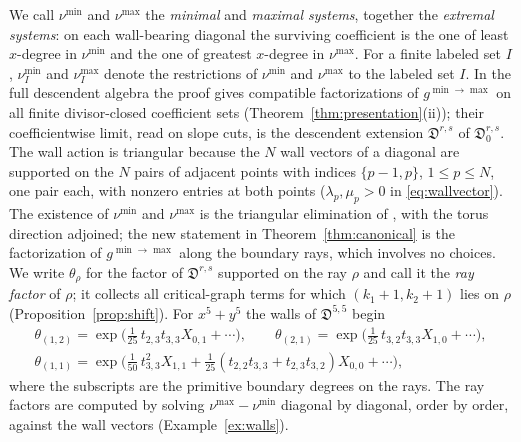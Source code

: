 \documentclass[11pt]{amsart}
\theoremstyle{definition}
\theoremstyle{remark}
\newcommand{\Dscr}{\mathfrak{D}}
\begin{document}
We call $\nu^{\min}$ and $\nu^{\max}$ the \emph{minimal} and \emph{maximal
systems}, together the \emph{extremal systems}: on each wall-bearing diagonal
the surviving coefficient is the one of least $x$-degree in $\nu^{\min}$ and
the one of greatest $x$-degree in $\nu^{\max}$.  For a finite labeled set $I$,
$\nu^{\min}_I$ and $\nu^{\max}_I$ denote the restrictions of $\nu^{\min}$ and
$\nu^{\max}$ to the labeled set $I$.  In the full descendent algebra the
proof gives compatible factorizations of $g^{\min\to\max}$ on all finite
divisor-closed coefficient sets (Theorem~\ref{thm:presentation}(ii)); their
coefficientwise limit, read on slope cuts, is the descendent extension
$\Dscr^{r,s}$ of $\Dscr^{r,s}_{0}$.  The wall action is triangular because
the $N$ wall vectors of a diagonal are supported on the $N$ pairs of adjacent
points with indices $\{p-1,p\}$, $1\le p\le N$, one pair each, with nonzero
entries at both points ($\lambda_p,\mu_p>0$ in \eqref{eq:wallvector}).  The existence
of $\nu^{\min}$ and $\nu^{\max}$ is the triangular elimination of \cite[proof of Thm.~4.27,
Step~3]{GKT}, with the torus direction adjoined; the new statement in
Theorem~\ref{thm:canonical} is the factorization of $g^{\min\to\max}$ along
the boundary rays, which involves no choices.  We write $\theta_{\rho}$ for
the factor of $\Dscr^{r,s}$ supported on the ray $\rho$ and call it the
\emph{ray factor} of $\rho$; it collects all critical-graph terms for which
$(k_{1}{+}1,k_{2}{+}1)$ lies on $\rho$ (Proposition~\ref{prop:shift}).  For
$x^{5}+y^{5}$ the walls of $\Dscr^{5,5}$ begin
\begin{gather*}
\theta_{(1,2)}=\exp\bigl(\tfrac1{25}\,t_{2,3}t_{3,3}X_{0,1}+\cdots\bigr),\qquad
\theta_{(2,1)}=\exp\bigl(\tfrac1{25}\,t_{3,2}t_{3,3}X_{1,0}+\cdots\bigr),\\
\theta_{(1,1)}=\exp\bigl(\tfrac1{50}\,t_{3,3}^{2}X_{1,1}
+\tfrac1{25}(t_{2,2}t_{3,3}+t_{2,3}t_{3,2})X_{0,0}+\cdots\bigr),
\end{gather*}
where the subscripts are the primitive boundary degrees on the rays.  The ray
factors are computed by solving $\nu^{\max}-\nu^{\min}$ diagonal by diagonal,
order by order, against the wall vectors (Example~\ref{ex:walls}).
\end{document}
